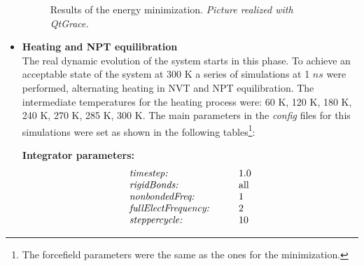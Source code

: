 \begin{itemize}
\begin{figure}[H]
\begin{minipage}[t]{0.775\textwidth}
    \footnotesize{\caption{Results of the energy minimization. \textit{Picture realized with QtGrace.}}
    \label{fig:energy-min}
    }
\end{minipage} 
\end{figure}


\item \textbf{Heating and NPT equilibration}\\
The real dynamic evolution of the system starts in this phase. To achieve an acceptable state of the system at 300 K a series of simulations at 1 $ns$ were performed, alternating heating in NVT and NPT equilibration. The intermediate temperatures for the heating process were: 60 K, 120 K, 180 K, 240 K, 270 K, 285 K, 300 K. The main parameters in the \textit{config} files for this simulations were set as shown in the following tables\footnote{The forcefield parameters were the same as the ones for the minimization.}:
\begin{center}
\begin{minipage}{0.45\textwidth}
\begin{center}
\textbf{Integrator parameters:}
\vspace{-0.25cm}
\begin{equation*}
\begin{array}{ll}
\text{\textit{timestep:}} \qquad\quad &1.0\\
\text{\textit{rigidBonds:}} \qquad\quad & \text{all}\\
\text{\textit{nonbondedFreq:}} \qquad\quad & 1\\
\text{\textit{fullElectFrequency:}} \qquad & 2\\
\text{\textit{steppercycle:}} \qquad & 10\\
\end{array}
\end{equation*}
\end{center}
\end{minipage}
\begin{minipage}{0.45\textwidth}

\end{minipage}
\end{center}
\end{itemize}
